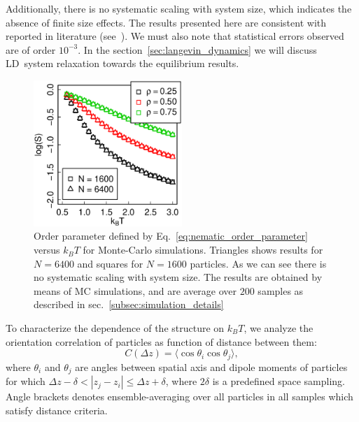 Additionally, there is no systematic scaling with system size, which indicates the absence of finite size effects. The results presented here are consistent with reported in literature (see~\cite{Marshall2015}). We must also note that statistical errors observed are of order $10^{-3}$. In the section~\ref{sec:langevin_dynamics} we will discuss LD~system relaxation towards the equilibrium results.

\begin{figure}[h]
\centering
	\includegraphics[width=0.5\textwidth]{Images/op_eq_log}
	\captionsetup{justification=centering, width=0.9\columnwidth}
	\caption{Order parameter defined by Eq.~\eqref{eq:nematic_order_parameter} versus $k_BT$ for Monte-Carlo simulations. Triangles shows results for $N = 6400$ and squares for $N = 1600$ particles. As we can see there is no systematic scaling with system size. The results are obtained by means of MC simulations, and are average over $200$ samples as described in sec.~\ref{subsec:simulation_details}}
	\label{fig:op_kbt}
\end{figure}

To characterize the dependence of the structure on $k_BT$, we analyze the orientation correlation of particles as function of distance between them:
\begin{equation}
\label{eq:distance_correlation}
	C(\Delta z) = \langle\cos \theta_i \cos \theta_j\rangle
	,
\end{equation}
where $\theta_i$ and $\theta_j$ are angles between spatial axis and dipole moments of particles for which $\Delta z - \delta < |z_j - z_i| \leq \Delta z + \delta$, where $2\delta$ is a predefined space sampling. Angle brackets denotes ensemble-averaging over all particles in all samples which satisfy distance criteria.

